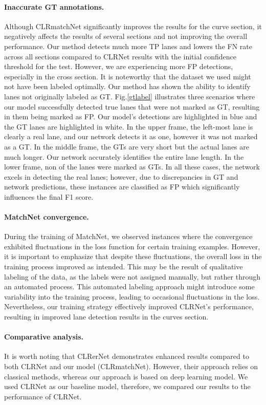 \documentclass[10pt,twocolumn,letterpaper]{article}
\begin{document}
\paragraph{Inaccurate GT annotations.} Although CLRmatchNet significantly improves the results for the curve section, it negatively affects the results of several sections and not improving the overall performance. Our method detects much more TP lanes and lowers the FN rate across all sections compared to CLRNet results with the initial confidence threshold for the test. However, we are experiencing more FP detections, especially in the cross section. It is noteworthy that the dataset we used might not have been labeled optimally. Our method has shown the ability to identify lanes not originally labeled as GT.  Fig.\ref{gtlabel} illustrates three scenarios where our model successfully detected true lanes that were not marked as GT, resulting in them being marked as FP. Our model's detections are highlighted in blue and the GT lanes are highlighted in white. In the upper frame, the left-most lane is clearly a real lane, and our network detects it as one, however it was not marked as a GT. In the middle frame, the GTs are very short but the actual lanes are much longer. Our network accurately identifies the entire lane length. In the lower frame, non of the lanes were marked as GTs. In all these cases, the network excels in detecting the real lanes; however, due to discrepancies in GT and network predictions, these instances are classified as FP which significantly influences the final F1 score.

\paragraph{MatchNet convergence.} During the training of MatchNet, we observed instances where the convergence exhibited fluctuations in the loss function for certain training examples. However, it is important to emphasize that despite these fluctuations, the overall loss in the training process improved as intended. This may be the result of qualitative labeling of the data, as the labels were not assigned manually, but rather through an automated process. This automated labeling approach might introduce some variability into the training process, leading to occasional fluctuations in the loss. Nevertheless, our training strategy effectively improved CLRNet's performance, resulting in improved lane detection results in the curves section.

\paragraph{Comparative analysis.} It is worth noting that CLRerNet\cite{CLRerNet} demonstrates enhanced results compared to both CLRNet and our model (CLRmatchNet). However, their approach relies on classical methods, whereas our approach is based on deep learning model. We used CLRNet as our baseline model, therefore, we compared our results to the performance of CLRNet.
\end{document}

